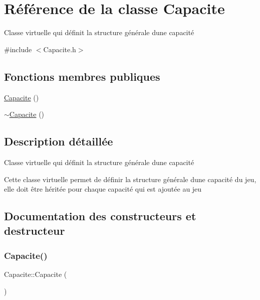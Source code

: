\hypertarget{class_capacite}{}\section{Référence de la classe Capacite}
\label{class_capacite}


Classe virtuelle qui définit la structure générale d\textquotesingle{}une capacité  




{\ttfamily \#include $<$Capacite.\+h$>$}

\subsection*{Fonctions membres publiques}
\begin{DoxyCompactItemize}
\item 
\hyperlink{class_capacite_a1c3b9e4e72d8d5494d1eb8ad15bb4d2a}{Capacite} ()
\item 
\hyperlink{class_capacite_a2224d62c03a73b7b34c0a5cb68c91279}{$\sim$\+Capacite} ()
\end{DoxyCompactItemize}


\subsection{Description détaillée}
Classe virtuelle qui définit la structure générale d\textquotesingle{}une capacité 

Cette classe virtuelle permet de définir la structure générale d\textquotesingle{}une capacité du jeu, elle doit être héritée pour chaque capacité qui est ajoutée au jeu 

\subsection{Documentation des constructeurs et destructeur}
\mbox{\label{class_capacite_a1c3b9e4e72d8d5494d1eb8ad15bb4d2a}} 
\subsubsection{\texorpdfstring{Capacite()}{Capacite()}}
{\footnotesize\ttfamily Capacite\+::\+Capacite (\begin{DoxyParamCaption}{ }\end{DoxyParamCaption})}

